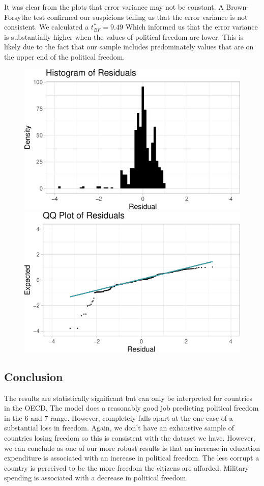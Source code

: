 \documentclass[
  english,
  man,floatsintext]{apa6}
\begin{document}
It was clear from the plots that error variance may not be constant. A Brown-Forsythe test confirmed our suspicions telling us that the error variance is not consistent. We calculated a \(t^{*}_{BF} = 9.49\) Which informed us that the error variance is substantially higher when the values of political freedom are lower. This is likely due to the fact that our sample includes predominately values that are on the upper end of the political freedom.

\begin{figure}
\includegraphics[width=0.5\linewidth]{paper_files/figure-latex/unnamed-chunk-6-1} \includegraphics[width=0.5\linewidth]{paper_files/figure-latex/unnamed-chunk-6-2} \caption{ }\label{fig:unnamed-chunk-6}
\end{figure}

\hypertarget{conclusion}{%
\subsection{Conclusion}\label{conclusion}}

The results are statistically significant but can only be interpreted for countries in the OECD. The model does a reasonably good job predicting political freedom in the 6 and 7 range. However, completely falls apart at the one case of a substantial loss in freedom. Again, we don't have an exhaustive sample of countries losing freedom so this is consistent with the dataset we have. However, we can conclude as one of our more robust results is that an increase in education expenditure is associated with an increase in political freedom. The less corrupt a country is perceived to be the more freedom the citizens are afforded. Military spending is associated with a decrease in political freedom.
\end{document}
